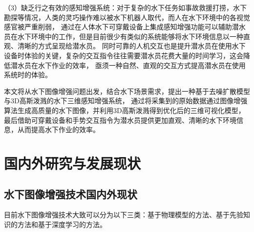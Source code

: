 （3）缺乏行之有效的感知增强系统：对于复杂的水下任务如事故救援打捞，水下勘探等情况，人类的灵巧操作难以被水下机器人取代，而人在水下环境中的各视觉感官被严重削弱，
通过在人体水下可穿戴设备上集成感知增强功能可以辅助潜水员在水下环境中的工作，但是目前很少有类似的系统能够将水下环境信息以一种直观、清晰的方式呈现给潜水员。
同时可靠的人机交互也是提升潜水员在使用水下设备时体验的关键，复杂的交互指令往往需要潜水员花费大量的时间学习，这会降低潜水员在水下作业的效率，
亟须一种自然、直观的交互方式提高潜水员在使用系统时的体验。




本文将从水下图像增强问题出发，结合水下场景需求，提出一种基于去噪扩散模型与3D高斯泼溅的水下三维感知增强系统，
通过将采集到的原始数据通过图像增强算法生成高质量的水下图像，并利用3D高斯泼溅得到优化后的三维可视化模型，
最后借助可穿戴设备和手势交互指令为潜水员提供更加直观、清晰的水下环境信息，从而提高水下作业的效率。


\section{国内外研究与发展现状}
\subsection{水下图像增强技术国内外现状}
目前水下图像增强技术大致可以分为以下三类：基于物理模型的方法、基于先验知识的方法和基于深度学习的方法。
